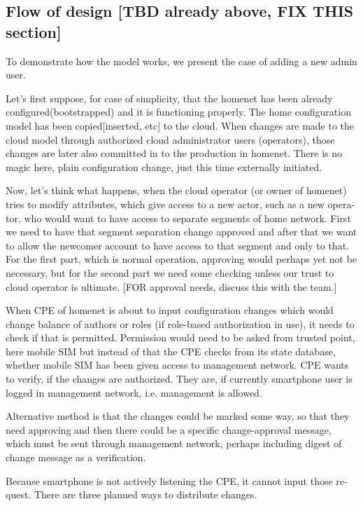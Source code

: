\documentclass[12pt,a4paper,english]{tutthesis}
\begin{document}
\begin{otherlanguage}{english}
\section{Flow of design [TBD already above, FIX THIS section]}
\label{sec-4-2}




To demonstrate how the model works, we present the case of adding a
new admin user.

Let's first suppose, for case of simplicity, that the homenet has been
already configured(bootstrapped) and it is functioning properly.  The
home configuration model has been copied[inserted, etc] to the cloud.
When changes are made to the cloud model through authorized cloud
administrator users (operators), those changes are later also committed
in to the production in homenet. There is no magic here, plain
configuration change, just this time externally initiated.

Now, let's think what happens, when the cloud operator (or owner of
homenet) tries to modify attributes, which give access to a new actor,
such as a new operator, who would want to have access to separate
segments of home network.  First we need to have that segment separation
change approved and after that we want to allow the newcomer account
to have access to that segment and only to that. For the first part,
which is normal operation, approving would perhaps yet not be
necessary, but for the second part we need some checking unless our
trust to cloud operator is ultimate.  [FOR approval needs, discuss
this with the team.]




When CPE of homenet is about to input configuration changes which
would change balance of authors or roles (if role-based authorization
in use), it needs to check if that is permitted.  Permission would 
need to be asked from trusted point, here mobile SIM but instead of
that the CPE checks from its state database, 
whether mobile SIM has been given access to management network.
CPE wants to verify, if the changes are authorized. They are, if currently
smartphone user is logged in management network, i.e. management is allowed.

Alternative method is that the changes could be marked some way, so that they need
approving and then there could be a specific change-approval message,
which must be sent through management network, perhaps including digest
of change message as a verification.

Because smartphone is not actively listening the CPE, it cannot input
those request. There are three planned ways to distribute changes.


\end{otherlanguage}
\end{document}
